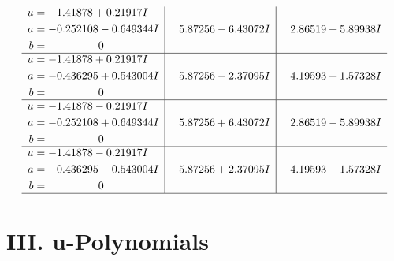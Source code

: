 \documentclass[1p]{elsarticle_modified}
\theoremstyle{definition}
\begin{document}
$$\begin{array}{c|c|c}
\begin{aligned}
u &= -1.41878 + 0.21917 I \\
a &= -0.252108 - 0.649344 I \\
b &= \phantom{-0.000000 } 0\end{aligned}
 & \phantom{-}5.87256 - 6.43072 I & \phantom{-}2.86519 + 5.89938 I \\ \hline\begin{aligned}
u &= -1.41878 + 0.21917 I \\
a &= -0.436295 + 0.543004 I \\
b &= \phantom{-0.000000 } 0\end{aligned}
 & \phantom{-}5.87256 - 2.37095 I & \phantom{-}4.19593 + 1.57328 I \\ \hline\begin{aligned}
u &= -1.41878 - 0.21917 I \\
a &= -0.252108 + 0.649344 I \\
b &= \phantom{-0.000000 } 0\end{aligned}
 & \phantom{-}5.87256 + 6.43072 I & \phantom{-}2.86519 - 5.89938 I \\ \hline\begin{aligned}
u &= -1.41878 - 0.21917 I \\
a &= -0.436295 - 0.543004 I \\
b &= \phantom{-0.000000 } 0\end{aligned}
 & \phantom{-}5.87256 + 2.37095 I & \phantom{-}4.19593 - 1.57328 I\\
 \hline 
 \end{array}$$\newpage
\newpage\renewcommand{\arraystretch}{1}
\centering \section*{ III. u-Polynomials}
\end{document}
